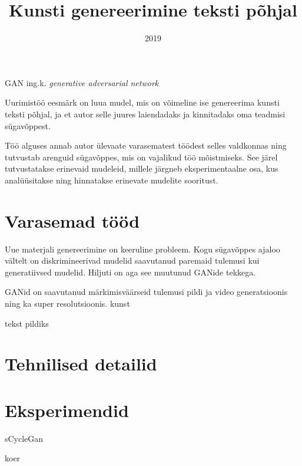 \documentclass{vilgym}
\title{Kunsti genereerimine teksti põhjal}
\date{2019}
\begin{document}
    \maketitle
    \tableofcontents

    \begin{description}
		\let\originalitem\item
		\renewcommand*{\item}[1][]{\originalitem[#1]\label{def:#1}}

        \item{GAN} ing.k. \textit{generative adversarial network}
    \end{description}

	\newcommand*{\seedefinition}[1]{(\hyperref[def:#1]{vt~definitsiooni})}

    

    Uurimistöö eesmärk on luua mudel, mis on võimeline ise genereerima kunsti teksti põhjal, ja et autor selle juures laiendadaks ja kinnitadaks oma teadmisi sügavõppest.

    Töö alguses annab autor ülevaate varasematest töödest selles valdkonnas ning tutvustab arenguid sügavõppes, mis on vajalikud töö mõistmiseks. See järel tutvustatakse erinevaid mudeleid, millele järgneb eksperimentaalne osa, kus analüüsitakse ning hinnatakse erinevate mudelite sooritust. 
    
    \section{Varasemad tööd}
    Uue materjali genereerimine on keeruline probleem. Kogu sügavõppes ajaloo vältelt on diskrimineerivad mudelid saavutanud paremaid tulemusi kui generatiivsed mudelid. Hiljuti on aga see muutunud GANide tekkega.

    GANid on saavutanud märkimisväärseid tulemusi pildi ja video generatsioonis ning ka super resolutsioonis. kunst

    tekst pildiks

    \section{Tehnilised detailid}

    \section{Eksperimendid}



    sCycleGan \cite{cyclgan}

    
    \begin{thebibliography}
         koer
    \end{thebibliography}
\end{document}
